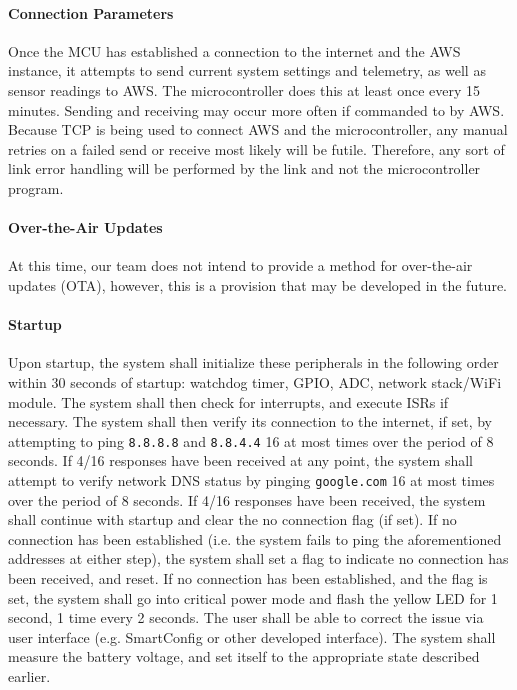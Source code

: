 \paragraph{Connection Parameters}
Once the MCU has established a connection to the internet and the AWS
instance, it attempts to send current system settings and telemetry, as
well as sensor readings to AWS. The microcontroller does this at least
once every 15 minutes. Sending and receiving may occur more often if
commanded to by AWS. Because TCP is being used to connect AWS and the
microcontroller, any manual retries on a failed send or receive most
likely will be futile. Therefore, any sort of link error handling will
be performed by the link and not the microcontroller program.

\paragraph{Over-the-Air Updates}
At this time, our team does not intend to provide a method for over-the-air
updates (OTA), however, this is a provision that may be developed in the
future.

\paragraph{Startup} Upon startup, the system shall initialize these peripherals in the following order within 30 seconds of startup: watchdog timer, GPIO, ADC, network stack/WiFi module. The system shall then check for interrupts, and execute ISRs if necessary. The system shall then verify its connection to the internet, if set, by attempting to ping \texttt{8.8.8.8} and \texttt{8.8.4.4} 16 at most times over the period of 8 seconds. If 4/16 responses have been received at any point, the system shall attempt to verify network DNS status by pinging \texttt{google.com} 16 at most times over the period of 8 seconds. If 4/16 responses have been received, the system shall continue with startup and clear the no connection flag (if set). If no connection has been established (i.e. the system fails to ping the aforementioned addresses at either step), the system shall set a flag to indicate no connection has been received, and reset. If no connection has been established, and the flag is set, the system shall go into critical power mode and flash the yellow LED for 1 second, 1 time every 2 seconds. The user shall be able to correct the issue via user interface (e.g. SmartConfig or other developed interface). The system shall measure the battery voltage, and set itself to the appropriate state described earlier.

